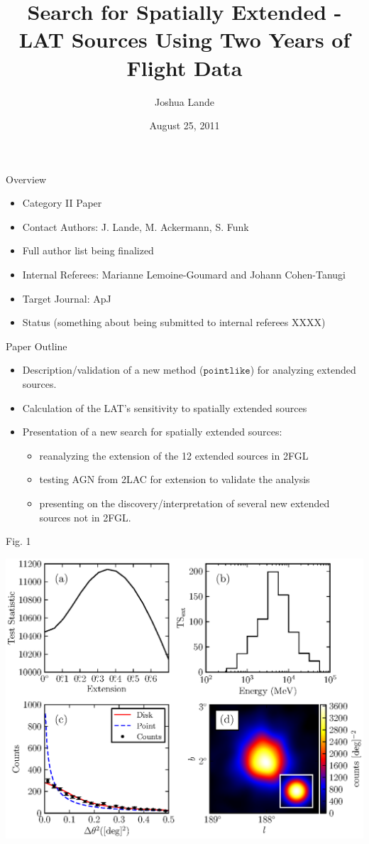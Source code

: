 \documentclass[12pt]{beamer}
\title{Search for Spatially Extended \fermi-LAT Sources Using Two Years of Flight
Data}
\author{Joshua Lande}
\institute{SLAC/Stanford}
\date{August 25, 2011}
\newcommand{\pointlike}{\ensuremath{\mathtt{pointlike}}\xspace}
\begin{document}
\fermititle



\begin{frame}{Overview}
  \begin{itemize}
    \item Category II Paper
    \item Contact Authors: J. Lande, M. Ackermann, S. Funk
    \item Full author list being finalized
    \item Internal Referees: Marianne Lemoine-Goumard and Johann Cohen-Tanugi
    \item Target Journal: ApJ
    \item Status (something about being submitted to internal referees XXXX)
  \end{itemize}
\end{frame}

\begin{frame}{Paper Outline}
  \begin{itemize}
    \item Description/validation of a new method (\pointlike) for analyzing extended sources.
    \item  Calculation of the LAT's sensitivity to spatially extended sources
    \item  Presentation of a new search for spatially extended sources:
      \begin{itemize}
        \item reanalyzing the extension of the 12 extended sources in 2FGL
        \item testing AGN from 2LAC for extension to validate the analysis
        \item presenting on the discovery/interpretation of several new extended sources not in 2FGL.
      \end{itemize}
  \end{itemize}
\end{frame}

\begin{frame}{Fig. 1}
  \begin{center}
    \includegraphics[scale=0.5]{../paper/ic443_plots/four_plots_ic443_color.eps}
  \end{center}
\end{frame}
\end{document}
